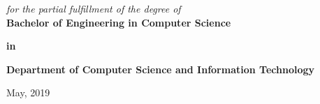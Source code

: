 \begin{titlepage}
\vspace{0.35cm}

\begin{center}
\textit{\large {for the partial fulfillment of the degree of}} \\
\vspace{0.8cm}
\textbf{\Large{Bachelor of Engineering in Computer Science}} \\
\end{center}

\begin{center}
\textbf{{\large{in}}}
\end{center}

\begin{center}
\textbf{\Large{Department of Computer Science and Information Technology}} \\
\end{center}

\vspace{0.5cm}

\begin{center}
\Large{May, 2019}
\end{center}

\end{titlepage}
